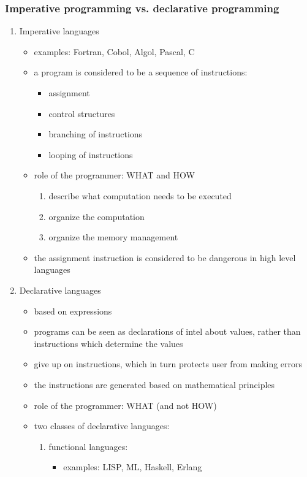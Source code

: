\documentclass[11pt]{article}
\begin{document}
\subsubsection{Imperative programming vs. declarative programming}
\label{sec:orgc521249}
\begin{enumerate}
\item Imperative languages
\label{sec:org752bc2e}
\begin{itemize}
\item examples: Fortran, Cobol, Algol, Pascal, C
\item a program is considered to be a sequence of instructions:
\begin{itemize}
\item assignment
\item control structures
\item branching of instructions
\item looping of instructions
\end{itemize}
\item role of the programmer: WHAT and HOW
\begin{enumerate}
\item describe what computation needs to be executed
\item organize the computation
\item organize the memory management
\end{enumerate}
\item the assignment instruction is considered to be dangerous in high level languages
\end{itemize}
\item Declarative languages
\label{sec:org4dc890c}
\begin{itemize}
\item based on expressions
\item programs can be seen as declarations of intel about values, rather than instructions which
determine the values
\item give up on instructions, which in turn protects user from making errors
\item the instructions are generated based on mathematical principles
\item role of the programmer: WHAT (and not HOW)
\item two classes of declarative languages:
\begin{enumerate}
\item functional languages:
\begin{itemize}
\item examples: LISP, ML, Haskell, Erlang

\end{itemize}
\end{enumerate}
\end{itemize}
\end{enumerate}
\end{document}
